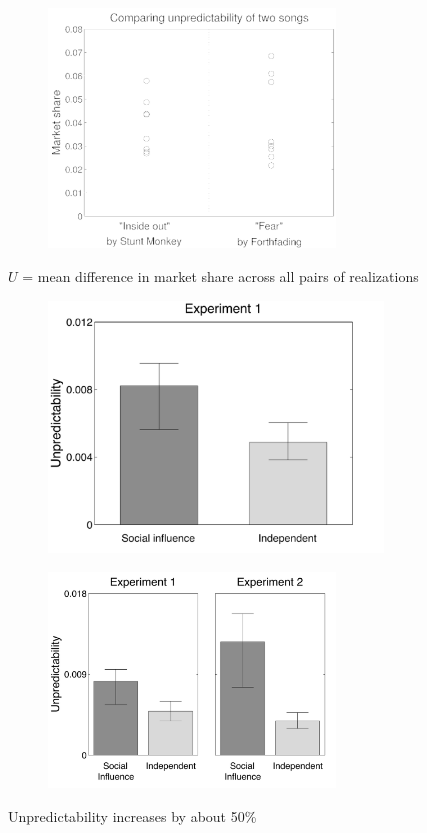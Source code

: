 \documentclass[aspectratio=169]{beamer}
\begin{document}
\begin{frame}

\begin{figure}
  \centering
  \includegraphics[width = 3in]{figures/arbitrary_example}
\end{figure}

$U$ = mean difference in market share across all pairs of realizations\\

\end{frame}
\begin{frame}

\begin{figure}
  \centering
  \includegraphics[width = 3.5in]{figures/unpredictability_v1}
\end{figure}

\end{frame}
\begin{frame}

\begin{figure}
  \centering
  \includegraphics[width=3in]{figures/compare_unpred_v1v2}
\end{figure}

Unpredictability increases by about 50\%
\end{frame}
\end{document}
